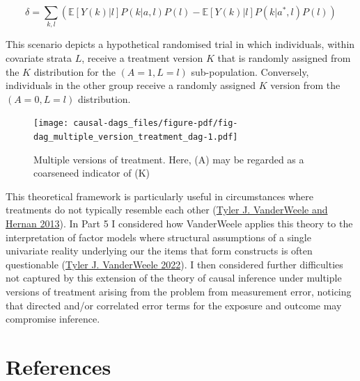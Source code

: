 \documentclass[
  singlecolumn]{report}
\begin{document}
\[ \delta = \sum_{k,l} \left( \mathbb{E}[Y(k)|l] P(k|a,l) P(l) - \mathbb{E}[Y(k)|l] P(k|a^*,l) P(l) \right) \]

This scenario depicts a hypothetical randomised trial in which
individuals, within covariate strata \(L\), receive a treatment version
\(K\) that is randomly assigned from the \(K\) distribution for the
\((A = 1, L = l)\) sub-population. Conversely, individuals in the other
group receive a randomly assigned \(K\) version from the
\((A = 0, L = l)\) distribution.

\begin{figure}

{\centering \texttt{[image: causal-dags\_files/figure-pdf/fig-dag\_multiple\_version\_treatment\_dag-1.pdf]}

}

\caption{\label{fig-dag_multiple_version_treatment_dag}Multiple versions
of treatment. Here, (A) may be regarded as a coarseneed indicator of
(K)}

\end{figure}

This theoretical framework is particularly useful in circumstances where
treatments do not typically resemble each other
(\protect\hyperlink{ref-vanderweele2013}{Tyler J. VanderWeele and Hernan
2013}). In Part 5 I considered how VanderWeele applies this theory to
the interpretation of factor models where structural assumptions of a
single univariate reality underlying our the items that form constructs
is often questionable (\protect\hyperlink{ref-vanderweele2022}{Tyler J.
VanderWeele 2022}). I then considered further difficulties not captured
by this extension of the theory of causal inference under multiple
versions of treatment arising from the problem from measurement error,
noticing that directed and/or correlated error terms for the exposure
and outcome may compromise inference.

\newpage{}

\hypertarget{references}{%
\section*{References}\label{references}}
\end{document}
